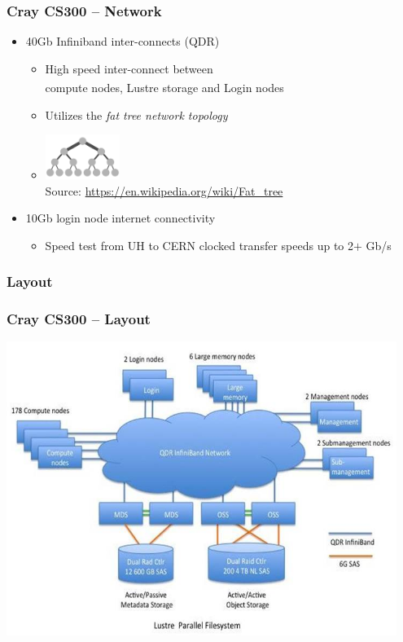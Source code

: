 \documentclass[t,hyperref={pdfpagelabels=false}]{beamer}
\newcommand{\regtrademark}{\fontsize{5}{6}\selectfont \textsuperscript{\textregistered}}
\newcommand{\lustre}{Lustre{\regtrademark}}
\begin{document}
\begin{frame}
	\frametitle{Cray CS300 -- Network}
	\begin{itemize}
		\item 40Gb Infiniband inter-connects (QDR)
		\begin{itemize}
			\item High speed inter-connect between~\\compute nodes, {\lustre} storage and Login nodes
			\item Utilizes the \emph{fat tree network topology}
			\item[] \includegraphics[width=0.20\textwidth]{images/Fat_tree_network} \\[-1ex] {\fontsize{3}{4} \selectfont Source: \url{https://en.wikipedia.org/wiki/Fat_tree} } 		
		\end{itemize}
		\item 10Gb login node internet connectivity
		\begin{itemize}
			\item Speed test from UH to CERN clocked transfer speeds up to 2$+$ Gb/s
		\end{itemize}	
	\end{itemize}
\end{frame}

\subsubsection{Layout}
\begin{frame}
	\frametitle{Cray CS300 -- Layout}
	\includegraphics[width=0.95\textwidth]{images/high_level}
\end{frame}
\end{document}
